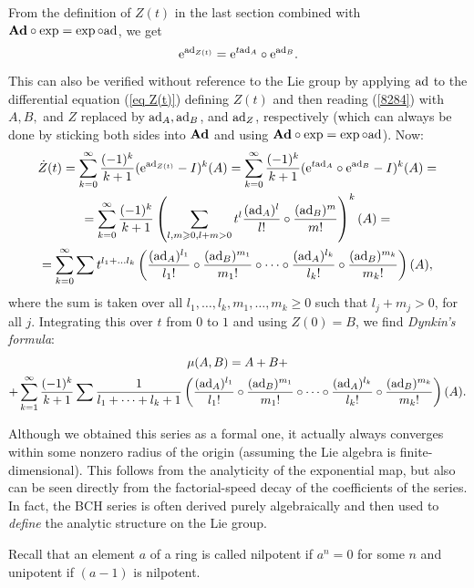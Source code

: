From the definition of $Z(t)$ in the last section combined with $\mathrm{\mathbf{Ad}}\circ \exp=\exp\circ\mathrm{ad}$, we get
\[\mathrm{e}^{\mathrm{ad}_{Z(t)}}=\mathrm{e}^{t\mathrm{ad}_A}\circ \mathrm{e}^{\mathrm{ad}_B}.\]
This can also be verified without reference to the Lie group by applying $\mathrm{ad}$ to the differential equation (\ref{eq Z(t)}) defining $Z(t)$ and then reading (\ref{8284}) with $A,B,$ and $Z$ replaced by $\mathrm{ad}_A,\mathrm{ad}_B$, and $\mathrm{ad}_Z$, respectively (which can always be done by sticking both sides into $\mathrm{\mathbf{Ad}}$ and using $\mathrm{\mathbf{Ad}}\circ\exp=\exp\circ\mathrm{ad}$). Now:
\begin{multline}
    \dot Z(t)=\sum_{k=0}^\infty \frac{(-1)^k}{k+1}(\mathrm{e}^{\mathrm{ad}_{Z(t)}}-I)^k(A)=\sum_{k=0}^\infty \frac{(-1)^k}{k+1}(\mathrm{e}^{t\mathrm{ad}_A}\circ \mathrm{e}^{\mathrm{ad}_B}-I)^k(A)=\\
    =\sum_{k=0}^\infty \frac{(-1)^k}{k+1}\left(\sum_{l,m\geqslant 0,l+m>0}t^l\frac{(\mathrm{ad}_A)^l}{l!}\circ \frac{(\mathrm{ad}_B)^m}{m!}\right)^k (A)=\\
    =\sum_{k=0}^\infty \sum t^{l_1+\ldots l_k}
    \left(
    \frac{(\mathrm{ad}_A)^{l_1}}{l_1!}\circ
    \frac{(\mathrm{ad}_B)^{m_1}}{m_1!}\circ\cdots\circ
    \frac{(\mathrm{ad}_A)^{l_k}}{l_k!}\circ
    \frac{(\mathrm{ad}_B)^{m_k}}{m_k!}
    \right)(A),
\end{multline}
where the sum is taken over all $l_1,\ldots,l_k,m_1,\ldots,m_k\geq 0$ such that $l_j+m_j>0$, for all $j$. Integrating this over $t$ from $0$ to $1$ and using $Z(0)=B$, we find \emph{Dynkin's formula}:
\begin{multline}
    \mu(A,B)=A+B+\\+\sum_{k=1}^\infty \frac{(-1)^k}{k+1}\sum \frac{1}{l_1+\cdots+l_k+1}\left(    
    \frac{(\mathrm{ad}_A)^{l_1}}{l_1!}\circ
    \frac{(\mathrm{ad}_B)^{m_1}}{m_1!}\circ\cdots\circ
    \frac{(\mathrm{ad}_A)^{l_k}}{l_k!}\circ
    \frac{(\mathrm{ad}_B)^{m_k}}{m_k!}\right)(A).
\end{multline}

\begin{rem}
    Although we obtained this series as a formal one, it actually always converges within some nonzero radius of the origin (assuming the Lie algebra is finite-dimensional). This follows from the analyticity of the exponential map, but also can be seen directly from the factorial-speed decay of the coefficients of the series. In fact, the BCH series is often derived purely algebraically and then used to \emph{define} the analytic structure on the Lie group.
\end{rem}

Recall that an element $a$ of a ring is called nilpotent if $a^n=0$ for some $n$ and unipotent if $(a-1)$ is nilpotent.


